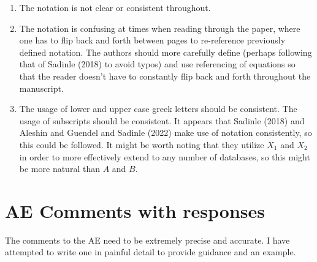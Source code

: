 \documentclass{article}
\begin{document}
\begin{enumerate}
\item The notation is not clear or consistent throughout. 
\item The notation is confusing at times when reading through the paper, where one has to flip back and forth between pages to re-reference previously defined notation. The authors should more carefully define (perhaps following that of Sadinle (2018) to avoid typos) and use referencing of equations so that the reader doesn't have to constantly flip back and forth throughout the manuscript. 
\item The usage of lower and upper case greek letters should be consistent. The usage of subscripts should be consistent. It appears that Sadinle (2018) and Aleshin and Guendel and Sadinle (2022) make use of notation consistently, so this could be followed. It might be worth noting that they utilize $X_1$ and $X_2$ in order to more effectively extend to any number of databases, so this might be more natural than $A$ and $B.$ 
\end{enumerate}




\newpage
\section{AE Comments with responses}

The comments to the AE need to be extremely precise and accurate. I have attempted to write one in painful detail to provide guidance and an example.
\end{document}
